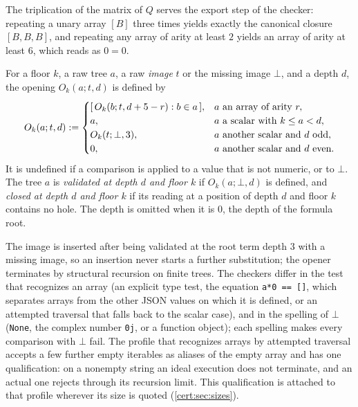 The triplication of the matrix of $Q$ serves the export step of the
checker: repeating a unary array $[B]$ three times yields exactly the
canonical closure $[B,B,B]$, and repeating any array of arity at least $2$
yields an array of arity at least $6$, which reads as $0=0$.

\begin{definition}[Opener]\label{cert:def:opener}
For a floor $k$, a raw tree $a$, a raw \emph{image} $t$ or the missing image
$\bot$, and a depth $d$, the opening $O_k(a;t,d)$ is defined by
\[
O_k(a;t,d)\mathrel{:=}
\begin{cases}
[\,O_k(b;t,d+5-r):b\in a\,], & a\text{ an array of arity }r,\\
a, & a\text{ a scalar with }k\le a<d,\\
O_k(t;\bot,3), & a\text{ another scalar and } d \text{ odd},\\
0, & a\text{ another scalar and } d \text{ even}.
\end{cases}
\]
It is undefined if a comparison is applied to a value that is not numeric, or
to $\bot$. The tree $a$ is \emph{validated at depth $d$ and floor $k$} if
$O_k(a;\bot,d)$ is defined, and \emph{closed at depth $d$ and floor $k$} if
its reading at a position of depth $d$ and floor $k$ contains no hole. The
depth is omitted when it is $0$, the depth of the formula root.
\end{definition}

The image is inserted after being validated at the root term depth $3$ with a
missing image, so an insertion never starts a further substitution; the
opener terminates by structural recursion on finite trees. The checkers
differ in the test that recognizes an array (an explicit type test, the
equation \texttt{a*0 == []}, which separates arrays from the other JSON
values on which it is defined, or an attempted traversal that falls back to
the scalar case), and in the spelling of $\bot$ (\texttt{None}, the complex
number \texttt{0j}, or a function object); each spelling makes every
comparison with $\bot$ fail. The profile that recognizes arrays by attempted
traversal accepts a few further empty iterables as aliases of the empty array
and has one qualification: on a nonempty string an ideal execution does not
terminate, and an actual one rejects through its recursion limit. This
qualification is attached to that profile wherever its size is quoted
(\cref{cert:sec:sizes}).

